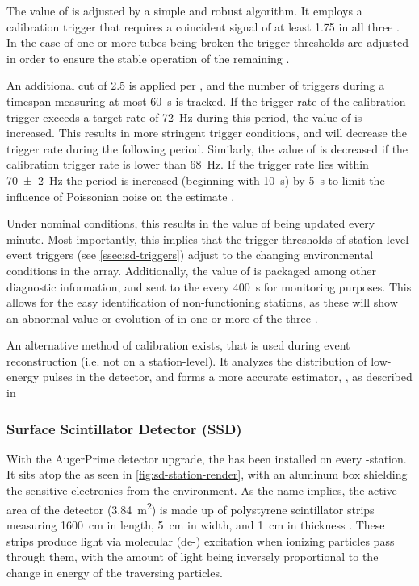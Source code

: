 The value of \VemOnline is adjusted by a simple and robust algorithm. It employs
a calibration trigger that requires a coincident signal of at least 
\SI{1.75}{\VemOnline} in all three \LPMTs. In the case of one or more tubes
being broken the trigger thresholds are adjusted in order to ensure the stable 
operation of the remaining \PMTs 
\cite{convengaLocalStationCalibrationDummies2023}.

An additional cut of \SI{2.5}{\VemOnline} is applied per \LPMT, and the number 
of triggers during a timespan measuring at most \SI{60}{\second} is tracked. If
the trigger rate of the calibration trigger exceeds a target rate of 
\SI{72}{\hertz} during this period, the value of \VemOnline is increased. This 
results in more stringent trigger conditions, and will decrease the trigger rate
during the following \DAQ period. Similarly, the value of \VemOnline is 
decreased if the calibration trigger rate is lower than \SI{68}{\hertz}. If the 
trigger rate lies within \SI{70\pm2}{\hertz} the \DAQ period is increased 
(beginning with \SI{10}{\second}) by \SI{5}{\second} to limit the influence of 
Poissonian noise on the estimate \cite{bertouCalibrationSurfaceArray2006, 
convengaLocalStationCalibrationDummies2023}.

Under nominal conditions, this results in the value of \VemOnline being updated
every minute. Most importantly, this implies that the trigger thresholds of 
station-level event triggers (see \cref{ssec:sd-triggers}) adjust to the
changing environmental conditions in the array. Additionally, the value of 
\VemOnline is packaged among other diagnostic information, and sent to the \CDAS
every \SI{400}{\second} for monitoring purposes. This allows for the easy 
identification of non-functioning stations, as these will show an abnormal value
or evolution of \VemOnline in one or more of the three \LPMTs. 

An alternative method of calibration exists, that is used during event 
reconstruction (i.e. not on a station-level). It analyzes the distribution of 
low-energy pulses in the detector, and forms a more accurate estimator, 
\VemOffline, as described in 

\subsubsection{Surface Scintillator Detector (SSD)}
\label{sssec:ssd}

With the AugerPrime detector upgrade, the \SSD has been installed on every 
\SD-station. It sits atop the \WCD as seen in \cref{fig:sd-station-render}, with
an aluminum box shielding the sensitive electronics from the environment. As the
name implies, the active area of the detector (\SI{3.84}{\meter\squared}) is 
made up of polystyrene scintillator strips measuring \SI{1600}{\centi\meter} in 
length, \SI{5}{\centi\meter} in width, and \SI{1}{\centi\meter} in thickness 
\cite{cataldiUpgradePierreAuger2022}. These strips produce light via molecular 
(de-) excitation when ionizing particles pass through them, with the amount of
light being inversely proportional to the change in energy of the traversing 
particles.

